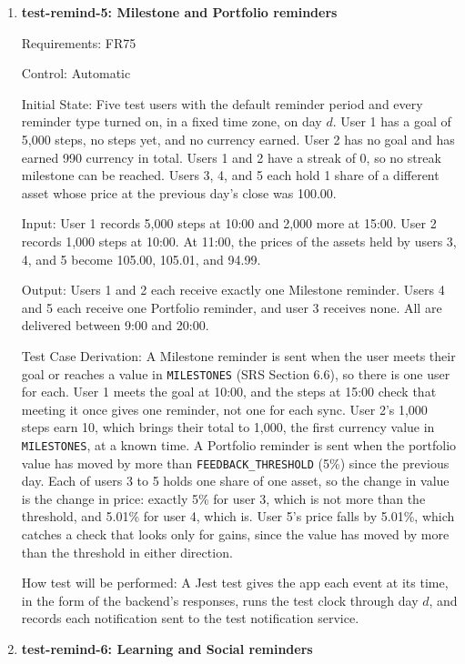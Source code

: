 \documentclass[12pt, titlepage]{article}
\begin{document}
\begin{enumerate}
\item{\textbf{test-remind-5: Milestone and Portfolio reminders}\\}

Requirements: FR75

Control: Automatic

Initial State: Five test users with the default reminder period and every
reminder type turned on, in a fixed time zone, on day $d$. User 1 has a goal
of 5,000 steps, no steps yet, and no currency earned. User 2 has no goal and
has earned 990 currency in total. Users 1 and 2 have a streak of 0, so no
streak milestone can be reached. Users 3, 4, and 5 each hold 1 share of a different asset
whose price at the previous day's close was 100.00.

Input: User 1 records 5,000 steps at 10:00 and 2,000 more at 15:00. User 2
records 1,000 steps at 10:00. At 11:00, the prices of the assets held by
users 3, 4, and 5 become 105.00, 105.01, and 94.99.

Output: Users 1 and 2 each receive exactly one Milestone reminder. Users 4
and 5 each receive one Portfolio reminder, and user 3 receives none. All are
delivered between 9:00 and 20:00.

Test Case Derivation: A Milestone reminder is sent when the user meets their
goal or reaches a value in \texttt{MILESTONES} (SRS Section 6.6), so there is
one user for each. User 1 meets the goal at 10:00, and the steps at 15:00
check that meeting it once gives one reminder, not one for each sync. User 2's
1,000 steps earn 10, which brings their total to 1,000, the first currency
value in \texttt{MILESTONES}, at a known time. A Portfolio reminder is sent
when the portfolio value has moved by more than \texttt{FEEDBACK\_THRESHOLD}
(5\%) since the previous day. Each of users 3 to 5 holds one share of one
asset, so the change in value is the change in price: exactly 5\% for user 3,
which is not more than the threshold, and 5.01\% for user 4, which is. User 5's
price falls by 5.01\%, which catches a check that looks only for gains, since
the value has moved by more than the threshold in either direction.

How test will be performed: A Jest test gives the app each event at its time,
in the form of the backend's responses, runs the test clock through day $d$,
and records each notification sent to the test notification service.

\item{\textbf{test-remind-6: Learning and Social reminders}\\}


\end{enumerate}
\end{document}
